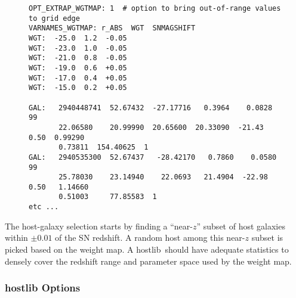 \documentclass[12pt]{article}
\newcommand{\hostlib}{{\sc hostlib}}
\begin{document}
{\begin{figure}[!]
\begin{center}
\begin{Verbatim}[frame=single]
OPT_EXTRAP_WGTMAP: 1  # option to bring out-of-range values to grid edge
VARNAMES_WGTMAP: r_ABS  WGT  SNMAGSHIFT
WGT:  -25.0  1.2  -0.05
WGT:  -23.0  1.0  -0.05
WGT:  -21.0  0.8  -0.05
WGT:  -19.0  0.6  +0.05
WGT:  -17.0  0.4  +0.05
WGT:  -15.0  0.2  +0.05

GAL:   2940448741  52.67432  -27.17716   0.3964    0.0828    99  
       22.06580    20.99990  20.65600  20.33090  -21.43 0.50  0.99290  
       0.73811  154.40625  1
GAL:   2940535300  52.67437   -28.42170   0.7860    0.0580    99    
       25.78030    23.14940    22.0693   21.4904  -22.98 0.50   1.14660  
       0.51003     77.85583  1
etc ...
\end{Verbatim}
\end{center}
\end{figure}

\clearpage
The host-galaxy selection starts by finding a ``near-$z$''
subset of host galaxies within $\pm 0.01$ of the SN redshift.
A random host among this near-$z$ subset is 
picked based on the weight map.
A \hostlib\ should have adequate statistics to densely
cover the redshift range and parameter space used by
the weight map.


\subsubsection{{\hostlib} Options}
\label{sss:hostlib_options}

}
\end{document}
